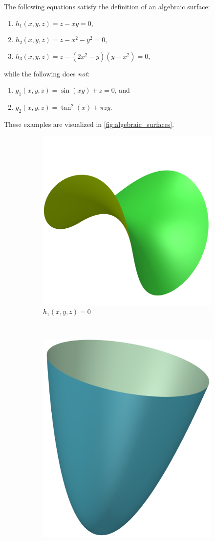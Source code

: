 \documentclass{article}
\begin{document}
    \begin{example}
        \label{exmpl:algebraic_surfaces}
        The following equations satisfy the definition of an algebraic surface:
        \begin{enumerate}
            \item $h_1(x, y, z) = z - xy = 0$,
            \item $h_2(x, y, z) = z - x^2 - y^2 = 0$,
            \item $h_3(x, y, z) = z - (2x^2 - y)(y - x^2) = 0$,
        \end{enumerate}
        while the following does \emph{not}:
        \begin{enumerate}[resume]
            \item $g_1(x, y, z) = \sin(xy) + z = 0$, and
            \item $g_2(x, y, z) = \tan^2(x) + \pi z y$.
        \end{enumerate}
        These examples are visualized in \cref{fig:algebraic_surfaces}.
        \begin{figure}[]
            \centering
            \begin{subfigure}[t]{0.3\textwidth}
                \includegraphics[height=0.6\textwidth]{pictures/example_one.png} 
                \caption{$h_1(x, y, z) = 0$}
            \end{subfigure}
            ~
            \begin{subfigure}[t]{0.3\textwidth}
                \includegraphics[height=0.6\textwidth]{pictures/example_two.png} 

\end{subfigure}
\end{figure}
\end{example}
\end{document}
